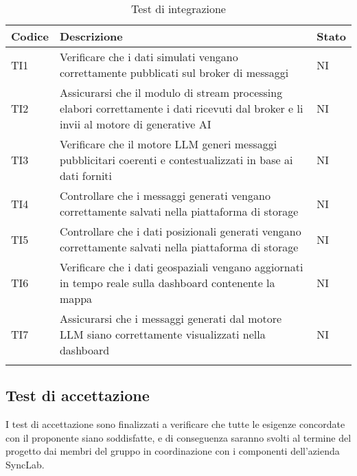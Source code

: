 \documentclass[10pt]{article}
\begin{document}
\begin{justify}
\begin{longtable}{|>{\centering\arraybackslash}m{2cm}|>{\centering\arraybackslash}m{7cm}|>{\centering\arraybackslash}m{2cm}|}
\hline
\textbf{Codice} & \textbf{Descrizione} & \textbf{Stato}\\
\endhead
\hline
TI1 & Verificare che i dati simulati vengano correttamente pubblicati sul broker di messaggi & NI\\
\hline
TI2 & Assicurarsi che il modulo di stream processing elabori correttamente i dati ricevuti dal broker e li invii al motore di generative AI & NI\\
\hline
TI3 & Verificare che il motore LLM generi messaggi pubblicitari coerenti e contestualizzati in base ai dati forniti & NI\\
\hline
TI4 & Controllare che i messaggi generati vengano correttamente salvati nella piattaforma di storage & NI\\
\hline
TI5 & Controllare che i dati posizionali generati vengano correttamente salvati nella piattaforma di storage & NI\\
\hline
TI6 & Verificare che i dati geospaziali vengano aggiornati in tempo reale sulla dashboard contenente la mappa & NI\\
\hline
TI7 & Assicurarsi che i messaggi generati dal motore LLM siano correttamente visualizzati nella dashboard & NI\\
\hline
\caption{Test di integrazione}\\
\end{longtable}

\subsection{Test di accettazione}
I test di accettazione sono finalizzati a verificare che tutte le esigenze concordate con il proponente siano soddisfatte, e di conseguenza saranno
svolti al termine del progetto dai membri del gruppo in coordinazione con i componenti dell'azienda SyncLab.\\


\end{justify}
\end{document}
